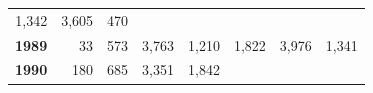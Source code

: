 \documentclass[]{article}
\begin{document}
\begin{longtable}[]{@{}rrrrrrrr@{}}
\begin{minipage}[t]{0.09\columnwidth}
1,342\strut
\end{minipage} & \begin{minipage}[t]{0.08\columnwidth}\raggedleft\strut
3,605\strut
\end{minipage} & \begin{minipage}[t]{0.10\columnwidth}\raggedleft\strut
470\strut
\end{minipage}\tabularnewline
\begin{minipage}[t]{0.08\columnwidth}\raggedleft\strut
\textbf{1989}\strut
\end{minipage} & \begin{minipage}[t]{0.10\columnwidth}\raggedleft\strut
33\strut
\end{minipage} & \begin{minipage}[t]{0.11\columnwidth}\raggedleft\strut
573\strut
\end{minipage} & \begin{minipage}[t]{0.08\columnwidth}\raggedleft\strut
3,763\strut
\end{minipage} & \begin{minipage}[t]{0.14\columnwidth}\raggedleft\strut
1,210\strut
\end{minipage} & \begin{minipage}[t]{0.09\columnwidth}\raggedleft\strut
1,822\strut
\end{minipage} & \begin{minipage}[t]{0.08\columnwidth}\raggedleft\strut
3,976\strut
\end{minipage} & \begin{minipage}[t]{0.10\columnwidth}\raggedleft\strut
1,341\strut
\end{minipage}\tabularnewline
\begin{minipage}[t]{0.08\columnwidth}\raggedleft\strut
\textbf{1990}\strut
\end{minipage} & \begin{minipage}[t]{0.10\columnwidth}\raggedleft\strut
180\strut
\end{minipage} & \begin{minipage}[t]{0.11\columnwidth}\raggedleft\strut
685\strut
\end{minipage} & \begin{minipage}[t]{0.08\columnwidth}\raggedleft\strut
3,351\strut
\end{minipage} & \begin{minipage}[t]{0.14\columnwidth}\raggedleft\strut
1,842\strut
\end{minipage} & \begin{minipage}[t]{0.09\columnwidth}\raggedleft\strut

\end{minipage}
\end{longtable}
\end{document}
